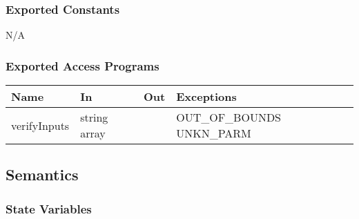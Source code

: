 \documentclass[12pt, titlepage]{article}
\begin{document}
\subsubsection{Exported Constants}
N/A

\subsubsection{Exported Access Programs}

\begin{center}
	\begin{tabular}{p{2cm} p{4cm} p{4cm} p{2cm}}
		\hline
		\textbf{Name} & \textbf{In} & \textbf{Out} & \textbf{Exceptions} \\
		\hline
		verifyInputs & string array & & OUT\_OF\_BOUNDS UNKN\_PARM \\
		\hline
	\end{tabular}
\end{center}

\subsection{Semantics}

\subsubsection{State Variables}
\end{document}
